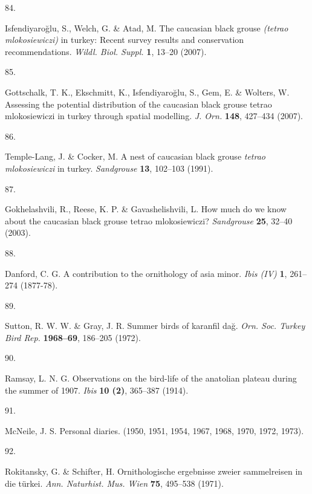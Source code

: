 \documentclass[
  letterpaper,
  DIV=11,
  numbers=noendperiod]{scrreprt}
\newlength{\cslhangindent}
\newlength{\csllabelwidth}
\newlength{\cslentryspacingunit} %
\newenvironment{CSLReferences}[2] %
 {%
  \setlength{\parindent}{0pt}
  \ifodd #1
  \let\oldpar\par
  \def\par{\hangindent=\cslhangindent\oldpar}
  \fi
  \setlength{\parskip}{#2\cslentryspacingunit}
 }%
 {}
\newcommand{\CSLLeftMargin}[1]{\parbox[t]{\csllabelwidth}{#1}}
\newcommand{\CSLRightInline}[1]{\parbox[t]{\linewidth - \csllabelwidth}{#1}\break}
\begin{document}
\begin{CSLReferences}{0}{0}
\leavevmode{}%
\CSLLeftMargin{84. }%
\CSLRightInline{Isfendiyaroğlu, S., Welch, G. \& Atad, M. The caucasian
black grouse \emph{(tetrao mlokosiewiczi)} in turkey: Recent survey
results and conservation recommendations. \emph{Wildl. Biol. Suppl.}
\textbf{1}, 13--20 (2007).}

\leavevmode{}%
\CSLLeftMargin{85. }%
\CSLRightInline{Gottschalk, T. K., Ekschmitt, K., Isfendiyaroğlu, S.,
Gem, E. \& Wolters, W. Assessing the potential distribution of the
caucasian black grouse tetrao mlokosiewiczi in turkey through spatial
modelling. \emph{J. Orn.} \textbf{148}, 427--434 (2007).}

\leavevmode{}%
\CSLLeftMargin{86. }%
\CSLRightInline{Temple-Lang, J. \& Cocker, M. A nest of caucasian black
grouse \emph{tetrao mlokosiewiczi} in turkey. \emph{Sandgrouse}
\textbf{13}, 102--103 (1991).}

\leavevmode{}%
\CSLLeftMargin{87. }%
\CSLRightInline{Gokhelashvili, R., Reese, K. P. \& Gavashelishvili, L.
How much do we know about the caucasian black grouse tetrao
mlokosiewiczi? \emph{Sandgrouse} \textbf{25}, 32--40 (2003).}

\leavevmode{}%
\CSLLeftMargin{88. }%
\CSLRightInline{Danford, C. G. A contribution to the ornithology of asia
minor. \emph{Ibis (IV)} \textbf{1}, 261--274 (1877-78).}

\leavevmode{}%
\CSLLeftMargin{89. }%
\CSLRightInline{Sutton, R. W. W. \& Gray, J. R. Summer birds of karanfil
dağ. \emph{Orn. Soc. Turkey Bird Rep.} \textbf{1968--69}, 186--205
(1972).}

\leavevmode{}%
\CSLLeftMargin{90. }%
\CSLRightInline{Ramsay, L. N. G. Observations on the bird-life of the
anatolian plateau during the summer of 1907. \emph{Ibis} \textbf{10
(2)}, 365--387 (1914).}

\leavevmode{}%
\CSLLeftMargin{91. }%
\CSLRightInline{McNeile, J. S. Personal diaries. (1950, 1951, 1954,
1967, 1968, 1970, 1972, 1973).}

\leavevmode{}%
\CSLLeftMargin{92. }%
\CSLRightInline{Rokitansky, G. \& Schifter, H. Ornithologische
ergebnisse zweier sammelreisen in die türkei. \emph{Ann. Naturhist. Mus.
Wien} \textbf{75}, 495--538 (1971).}


\end{CSLReferences}
\end{document}
